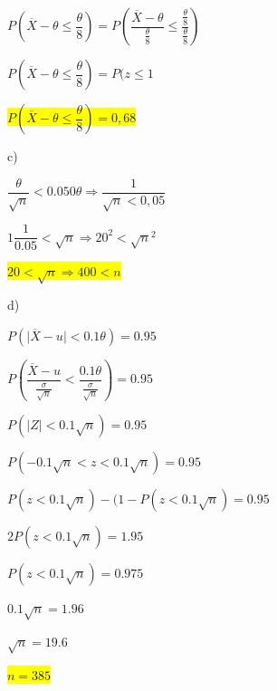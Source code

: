 \documentclass[DIV=calc,paper=a4,fontsize=11pt,openany]{book}
\begin{document}
\begin{center}
$P( \overline{X} - \theta  \leq \dfrac{\theta}{8}) = P\left( \dfrac{\overline{X}- \theta}{\frac{\theta}{8}} \leq \dfrac{\frac{\theta}{8}}{\frac{\theta}{8}}\right)$ 
\end{center}
\begin{center}
$ P( \overline{X} - \theta  \leq \dfrac{\theta}{8}) = P(z \leq 1$
\end{center}
\begin{center}
\colorbox{yellow}{$P( \overline{X} - \theta  \leq \dfrac{\theta}{8}) = 0,68$} 
\end{center}
c)
\begin{center}
$\dfrac{\theta}{\sqrt{n}} < 0.050\theta \Rightarrow \dfrac{1}{\sqrt{n} < 0,05}$
\end{center}
\begin{center}
$1\dfrac{1}{0.05}<\sqrt{n} \Rightarrow 20^{2} < \sqrt{n}^{2}$
\end{center}
\begin{center}
\colorbox{yellow}{$20 < \sqrt{n} \Rightarrow 400 < n$}
\end{center}
d)
\begin{center}
$P(\mid \overline{X}-u \mid < 0.1\theta)=0.95$
\end{center}
\begin{center}
$P\left( \dfrac{\overline{X}-u}{\frac{\sigma}{\sqrt{n}}} < \dfrac{0.1\theta}{\frac{\sigma}{\sqrt{n}}}\right)= 0.95$
\end{center}
\begin{center}
$P(\mid Z \mid < 0.1\sqrt{n}) = 0.95$
\end{center}
\begin{center}
$P(-0.1\sqrt{n} < z < 0.1\sqrt{n}) = 0.95$
\end{center}
\begin{center}
$P(z < 0.1\sqrt{n})- (1-P(z < 0.1\sqrt{n}) = 0.95$
\end{center}
\begin{center}
$2P( z < 0.1\sqrt{n}) = 1.95$
\end{center}
\begin{center}
$P(z < 0.1\sqrt{n}) = 0.975$
\end{center}
\begin{center}
$0.1\sqrt{n} = 1.96$
\end{center}
\begin{center}
$\sqrt{n} = 19.6$
\end{center}
\begin{center}
\colorbox{yellow}{$n = 385 $}
\end{center}
\end{document}
